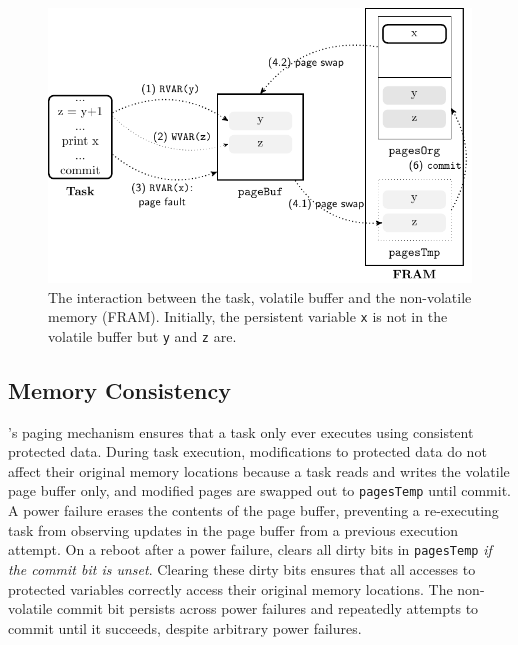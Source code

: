 \begin{figure}[t]
	\centering
	\includegraphics[width=0.75\columnwidth]{figures/sram-buffer}
	\caption{The interaction between the task, volatile buffer and the non-volatile memory (FRAM). Initially, the persistent variable \texttt{x} is not in the volatile buffer but \texttt{y} and \texttt{z} are.}
	\label{fig:volatile-buffer}
\end{figure}

\subsection{Memory Consistency}

\sys's paging mechanism ensures that a task only ever executes using consistent protected data. During task execution, modifications to protected data do not affect their original memory locations because a task reads and writes the volatile page buffer only, and modified pages are swapped out to \texttt{pagesTemp} until commit. A power failure erases the contents of the page buffer, preventing a re-executing task from observing updates in the page buffer from a previous execution attempt. On a reboot after a power failure, \sys clears all dirty bits in {\tt pagesTemp} {\em if the commit bit is unset}. Clearing these dirty bits ensures that all accesses to protected variables correctly access their original memory locations. The non-volatile commit bit persists across power failures and \sys repeatedly attempts to commit until it succeeds, despite arbitrary power failures.

